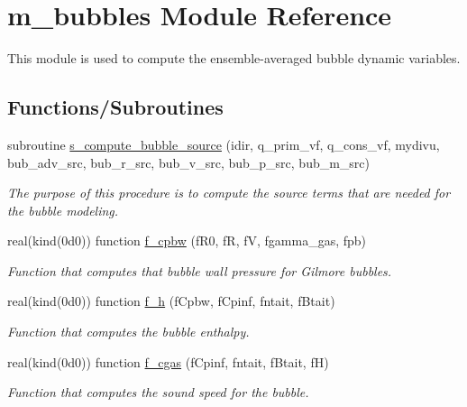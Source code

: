 \hypertarget{namespacem__bubbles}{}\section{m\+\_\+bubbles Module Reference}
\label{namespacem__bubbles}


This module is used to compute the ensemble-\/averaged bubble dynamic variables.  


\subsection*{Functions/\+Subroutines}
\begin{DoxyCompactItemize}
\item 
subroutine \hyperlink{namespacem__bubbles_af5559af46da9282b9cc64db837958f90}{s\+\_\+compute\+\_\+bubble\+\_\+source} (idir, q\+\_\+prim\+\_\+vf, q\+\_\+cons\+\_\+vf, mydivu, bub\+\_\+adv\+\_\+src, bub\+\_\+r\+\_\+src, bub\+\_\+v\+\_\+src, bub\+\_\+p\+\_\+src, bub\+\_\+m\+\_\+src)
\begin{DoxyCompactList}\small\item\em The purpose of this procedure is to compute the source terms that are needed for the bubble modeling. \end{DoxyCompactList}\item 
real(kind(0d0)) function \hyperlink{namespacem__bubbles_acfe552b68c999e11b895e5cfca6a8786}{f\+\_\+cpbw} (f\+R0, fR, fV, fgamma\+\_\+gas, fpb)
\begin{DoxyCompactList}\small\item\em Function that computes that bubble wall pressure for Gilmore bubbles. \end{DoxyCompactList}\item 
real(kind(0d0)) function \hyperlink{namespacem__bubbles_a8f3891f06e63f4c4ee3d749f68bfabd8}{f\+\_\+h} (f\+Cpbw, f\+Cpinf, fntait, f\+Btait)
\begin{DoxyCompactList}\small\item\em Function that computes the bubble enthalpy. \end{DoxyCompactList}\item 
real(kind(0d0)) function \hyperlink{namespacem__bubbles_a5c730e118a27d95c21388bcc2189cc76}{f\+\_\+cgas} (f\+Cpinf, fntait, f\+Btait, fH)
\begin{DoxyCompactList}\small\item\em Function that computes the sound speed for the bubble. \end{DoxyCompactList}\item 

\end{DoxyCompactItemize}
